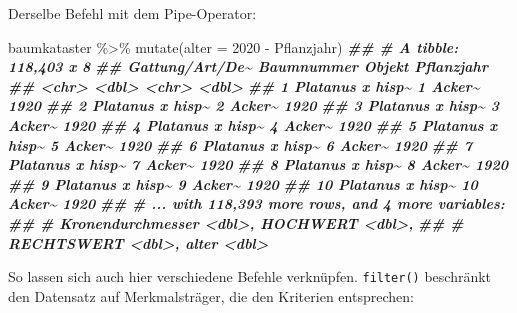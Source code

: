 \documentclass[
  ngerman,
]{article}
\newenvironment{Shaded}{\begin{snugshade}}{\end{snugshade}}
\newcommand{\AttributeTok}[1]{\textcolor[rgb]{0.77,0.63,0.00}{#1}}
\newcommand{\DecValTok}[1]{\textcolor[rgb]{0.00,0.00,0.81}{#1}}
\newcommand{\DocumentationTok}[1]{\textcolor[rgb]{0.56,0.35,0.01}{\textbf{\textit{#1}}}}
\newcommand{\FunctionTok}[1]{\textcolor[rgb]{0.00,0.00,0.00}{#1}}
\newcommand{\NormalTok}[1]{#1}
\newcommand{\SpecialCharTok}[1]{\textcolor[rgb]{0.00,0.00,0.00}{#1}}
\begin{document}
Derselbe Befehl mit dem Pipe-Operator:

\begin{Shaded}
\begin{Highlighting}[]
\NormalTok{baumkataster }\SpecialCharTok{\%\textgreater{}\%}
  \FunctionTok{mutate}\NormalTok{(}\AttributeTok{alter =} \DecValTok{2020} \SpecialCharTok{{-}}\NormalTok{ Pflanzjahr)}
\DocumentationTok{\#\# \# A tibble: 118,403 x 8}
\DocumentationTok{\#\#    \textasciigrave{}Gattung/Art/De\textasciitilde{} Baumnummer Objekt Pflanzjahr}
\DocumentationTok{\#\#    \textless{}chr\textgreater{}                 \textless{}dbl\textgreater{} \textless{}chr\textgreater{}       \textless{}dbl\textgreater{}}
\DocumentationTok{\#\#  1 Platanus x hisp\textasciitilde{}          1 Acker\textasciitilde{}       1920}
\DocumentationTok{\#\#  2 Platanus x hisp\textasciitilde{}          2 Acker\textasciitilde{}       1920}
\DocumentationTok{\#\#  3 Platanus x hisp\textasciitilde{}          3 Acker\textasciitilde{}       1920}
\DocumentationTok{\#\#  4 Platanus x hisp\textasciitilde{}          4 Acker\textasciitilde{}       1920}
\DocumentationTok{\#\#  5 Platanus x hisp\textasciitilde{}          5 Acker\textasciitilde{}       1920}
\DocumentationTok{\#\#  6 Platanus x hisp\textasciitilde{}          6 Acker\textasciitilde{}       1920}
\DocumentationTok{\#\#  7 Platanus x hisp\textasciitilde{}          7 Acker\textasciitilde{}       1920}
\DocumentationTok{\#\#  8 Platanus x hisp\textasciitilde{}          8 Acker\textasciitilde{}       1920}
\DocumentationTok{\#\#  9 Platanus x hisp\textasciitilde{}          9 Acker\textasciitilde{}       1920}
\DocumentationTok{\#\# 10 Platanus x hisp\textasciitilde{}         10 Acker\textasciitilde{}       1920}
\DocumentationTok{\#\# \# ... with 118,393 more rows, and 4 more variables:}
\DocumentationTok{\#\# \#   Kronendurchmesser \textless{}dbl\textgreater{}, HOCHWERT \textless{}dbl\textgreater{},}
\DocumentationTok{\#\# \#   RECHTSWERT \textless{}dbl\textgreater{}, alter \textless{}dbl\textgreater{}}
\end{Highlighting}
\end{Shaded}

So lassen sich auch hier verschiedene Befehle verknüpfen. \texttt{filter()} beschränkt den Datensatz auf Merkmalsträger, die den Kriterien entsprechen:
\end{document}
